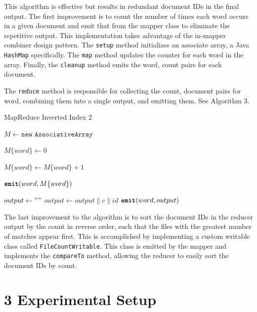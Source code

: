 \documentclass{bsu-ms}
\begin{document}
This algorithm is effective but results in redundant document IDs in the final output. The first improvement is to count the number of times each word occurs in a given document and emit that from the mapper class to eliminate the repetitive output. This implementation takes advantage of the in-mapper combiner design pattern. The \texttt{setup} method initializes an associate array, a Java \texttt{HashMap} specifically. The \texttt{map} method updates the counter for each word in the array. Finally, the \texttt{cleanup} method emits the word, count pairs for each document.

The \texttt{reduce} method is responsible for collecting the count, document pairs for word, combining them into a single output, and emitting them. See Algorithm 3.

\begin{algorithm}
	\caption{MapReduce Inverted Index 2}
	\label{alg:alg3}
	\begin{algorithmic}[0]
			\State $M \gets \texttt{new AssociativeArray}$
		\EndFunction
		
		\State $M\{word\} \gets 0$
		\EndIf
		
		\State $M\{word\} \gets M\{word\} + 1$
		\EndFor
		\EndFunction		
		
		\State $\texttt{\textbf{emit}}(word, M\{word\})$
		\EndFor
		\EndFunction
		
		\State $output \gets ""$
		\State $output \gets output \| c \| id$
		\EndFor
		\State $\texttt{\textbf{emit}}(word, output)$
		\EndFunction		
	\end{algorithmic}
\end{algorithm}

The last improvement to the algorithm is to sort the document IDs in the reducer output by the count in reverse order, such that the files with the greatest number of matches appear first. This is accomplished by implementing a custom writable class called \texttt{FileCountWritable}. This class is emitted by the mapper and implements the \texttt{compareTo} method, allowing the reducer to easily sort the document IDs by count.

\section*{3 Experimental Setup}
\end{document}
